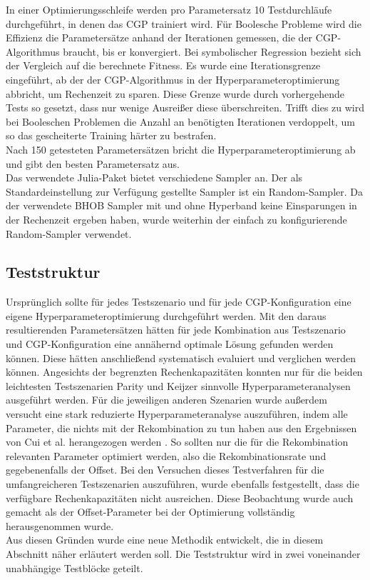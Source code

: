 In einer Optimierungsschleife werden pro Parametersatz 10 Testdurchläufe durchgeführt, in denen das CGP trainiert wird.
Für Boolesche Probleme wird die Effizienz die Parametersätze anhand der Iterationen gemessen, die der CGP-Algorithmus braucht, bis er konvergiert.
Bei symbolischer Regression bezieht sich der Vergleich auf die berechnete Fitness.
Es wurde eine Iterationsgrenze eingeführt, ab der der CGP-Algorithmus in der Hyperparameteroptimierung abbricht, um Rechenzeit zu sparen.
Diese Grenze wurde durch vorhergehende Tests so gesetzt, dass nur wenige Ausreißer diese überschreiten.
Trifft dies zu wird bei Booleschen Problemen die Anzahl an benötigten Iterationen verdoppelt, um so das gescheiterte Training härter zu bestrafen.\\
Nach 150 getesteten Parametersätzen bricht die Hyperparameteroptimierung ab und gibt den besten Parametersatz aus.\\

Das verwendete Julia-Paket bietet verschiedene Sampler an.
Der als Standardeinstellung zur Verfügung gestellte Sampler ist ein Random-Sampler.
Da der verwendete BHOB Sampler mit und ohne Hyperband keine Einsparungen in der Rechenzeit ergeben haben, wurde weiterhin der einfach zu konfigurierende Random-Sampler verwendet. 

\subsection{Teststruktur}
\label{subsec:struktur}

Ursprünglich sollte für jedes Testszenario und für jede CGP-Konfiguration eine eigene Hyperparameteroptimierung durchgeführt werden.
Mit den daraus resultierenden Parametersätzen hätten für jede Kombination aus Testszenario und CGP-Konfiguration eine annähernd optimale Lösung gefunden werden können.
Diese hätten anschließend systematisch evaluiert und verglichen werden können.
Angesichts der begrenzten Rechenkapazitäten konnten nur für die beiden leichtesten Testszenarien Parity und Keijzer sinnvolle Hyperparameteranalysen ausgeführt werden.
Für die jeweiligen anderen Szenarien wurde außerdem versucht eine stark reduzierte Hyperparameteranalyse auszuführen, indem alle Parameter, die nichts mit der Rekombination zu tun haben aus den Ergebnissen von Cui et al. herangezogen werden \cite{cui_results}.
So sollten nur die für die Rekombination relevanten Parameter optimiert werden, also die Rekombinationsrate und gegebenenfalls der Offset.
Bei den Versuchen dieses Testverfahren für die umfangreicheren Testszenarien auszuführen, wurde ebenfalls festgestellt, dass die verfügbare Rechenkapazitäten nicht ausreichen.
Diese Beobachtung wurde auch gemacht als der Offset-Parameter bei der Optimierung vollständig herausgenommen wurde.\\
Aus diesen Gründen wurde eine neue Methodik entwickelt, die in diesem Abschnitt näher erläutert werden soll.
Die Teststruktur wird in zwei voneinander unabhängige Testblöcke geteilt.

